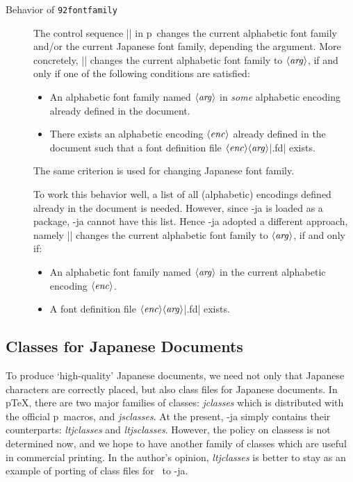 \documentclass{ajt}
\begin{document}
\begin{description}
\item[Behavior of\/ {\tt\char92fontfamily\/}]
The control sequence |\fontfamily| in p\LaTeXe\ changes the current alphabetic
	   font family and/or the current Japanese font family,
	   depending the argument. More concretely,
	   || changes the
	   current alphabetic font family to $\langle\hbox{\it
	   arg\/}\rangle$, if and only if one of the following
	   conditions are satisfied:
\begin{itemize}
\item An alphabetic font family named $\langle\hbox{\it arg\/}\rangle$ in
      \emph{some} alphabetic encoding already defined in the document.
\item There exists an alphabetic encoding $\langle\hbox{\it
      enc\/}\rangle$ already defined in the document such that a font
      definition file $\langle\hbox{\it enc\/}\rangle\langle\hbox{\it
      arg\/}\rangle$|.fd| exists.
\end{itemize}
The same criterion is used for changing Japanese font family.

To work this behavior well, a list of all (alphabetic) encodings defined
	   already in the document is needed. However, since \LuaTeX-ja
	   is loaded as a package, \LuaTeX-ja cannot have this list.
	   Hence \LuaTeX-ja adopted a different approach, namely
	   || changes the
	   current alphabetic font family to $\langle\hbox{\it
	   arg\/}\rangle$, if and only if:
\begin{itemize}
\item An alphabetic font family named $\langle\hbox{\it arg\/}\rangle$ in
      the current alphabetic encoding $\langle\hbox{\it enc\/}\rangle$.
\item A  font definition file $\langle\hbox{\it enc\/}\rangle\langle\hbox{\it
      arg\/}\rangle$|.fd| exists.
\end{itemize}


\end{description}



\subsection{Classes for Japanese Documents}
To produce `high-quality' Japanese documents, we need not only that
Japanese characters are correctly placed, but also class files for
Japanese documents. In p\TeX, there are two major families of classes:
\emph{jclasses} which is distributed with the official p\LaTeXe\ macros,
and \emph{jsclasses}.  At the present, \LuaTeX-ja
simply contains their counterparts: \emph{ltjclasses} and
\emph{ltjsclasses}. However, the policy on classess is not determined
now, and we hope to have another family of classes which are useful in
commercial printing.  In the author's opinion, \emph{ltjclasses} is
better to stay as an example of porting of class files for \pTeX\ to
\LuaTeX-ja.
\end{document}
